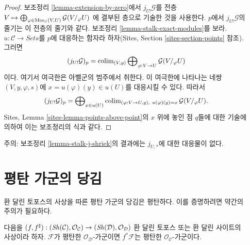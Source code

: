 \begin{proof}
보조정리 \ref{lemma-extension-by-zero}에서 $j_{U!}\mathcal{G}$를 전층
$V \mapsto
\bigoplus\nolimits_{\varphi \in \mathop{\mathrm{Mor}}\nolimits_\mathcal{C}(V, U)}
\mathcal{G}(V/_\varphi U)$
에 결부된 층으로 기술한 것을 사용한다. $p$에서 $j_{U!}\mathcal{G}$의
줄기는 이 전층의 줄기와 같다. 보조정리
\ref{lemma-stalk-exact-modules}를 보라. $u : \mathcal{C} \to \textit{Sets}$를
$p$에 대응하는 함자라 하자(Sites, Section \ref{sites-section-points} 참조).
그러면
$$
(j_{U!}\mathcal{G})_p = \mathop{\mathrm{colim}}\nolimits_{(V, y)}
\bigoplus\nolimits_{\varphi : V \to U} \mathcal{G}(V/_\varphi U)
$$
이다. 여기서 여극한은 아벨군의 범주에서 취한다. 이 여극한에 나타나는
네쌍 $(V, y, \varphi, s)$에 $x = u(\varphi)(y) \in u(U)$를 대응시킬 수
있다. 따라서
$$
(j_{U!}\mathcal{G})_p =
\bigoplus\nolimits_{x \in u(U)}
\mathop{\mathrm{colim}}\nolimits_{(\varphi : V \to U, y), \ u(\varphi)(y) = x} \mathcal{G}(V/_\varphi U).
$$
Sites, Lemma \ref{sites-lemma-points-above-point}의 $x$ 위에 놓인 점
$q$들에 대한 기술에 의하여 이는 보조정리의 식과 같다.
\end{proof}

\begin{remark}
\label{remark-not-pushforward}
주의: 보조정리 \ref{lemma-stalk-j-shriek}의 결과에는 $j_{U, *}$에 대한
대응물이 없다.
\end{remark}












\section{평탄 가군의 당김}
\label{section-pullback-flat}

\noindent
환 달린 토포스의 사상을 따른 평탄 가군의 당김은 평탄하다.
이를 증명하려면 약간의 주의가 필요하다.

\begin{lemma}
\label{lemma-pullback-flat}
\begin{reference}
\cite[Expos\'e V, Corollary 1.7.1]{SGA4}
\end{reference}
다음을
$(f, f^\sharp) :
(\mathop{\mathit{Sh}}\nolimits(\mathcal{C}), \mathcal{O}_\mathcal{C})
\to
(\mathop{\mathit{Sh}}\nolimits(\mathcal{D}), \mathcal{O}_\mathcal{D})$
환 달린 토포스 또는 환 달린 사이트의 사상이라 하자.
$\mathcal{F}$가 평탄한 $\mathcal{O}_\mathcal{D}$-가군이면
$f^*\mathcal{F}$는 평탄한 $\mathcal{O}_\mathcal{C}$-가군이다.
\end{lemma}

